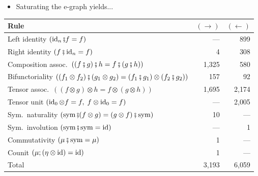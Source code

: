 \documentclass[aspectratio=169]{beamer}
\begin{document}
\begin{frame}
\vfill
\begin{itemize}
\item Saturating the e-graph yields...
\end{itemize}
\centering
\small
\begin{tabular}{@{}lrr@{}}
\toprule
Rule & $(\to)$ & $(\leftarrow)$ \\
\midrule
Left identity \hfill $(\operatorname{id}_n \fatsemi f = f)$ & --- & 899 \\
Right identity \hfill $(f \fatsemi \operatorname{id}_n = f)$ & 4 & 308 \\
Composition assoc.\ \hfill $((f \fatsemi g) \fatsemi h = f \fatsemi (g \fatsemi h))$ & 1{,}325 & 580 \\
Bifunctoriality \hfill $((f_1 \otimes f_2) \fatsemi (g_1 \otimes g_2) = (f_1 \fatsemi g_1) \otimes (f_2 \fatsemi g_2))$ & 157 & 92 \\
Tensor assoc.\ \hfill $((f \otimes g) \otimes h = f \otimes (g \otimes h))$ & 1{,}695 & 2{,}174 \\
Tensor unit \hfill $(\operatorname{id}_0 \otimes f = f,\; f \otimes \operatorname{id}_0 = f)$ & --- & 2{,}005 \\
Sym.\ naturality \hfill $(\operatorname{sym} \fatsemi (f \otimes g) = (g \otimes f) \fatsemi \operatorname{sym})$ & 10 & --- \\
Sym.\ involution \hfill $(\operatorname{sym} \fatsemi \operatorname{sym} = \operatorname{id})$ & --- & 1 \\
Commutativity \hfill $(\mu \fatsemi \operatorname{sym} = \mu)$ & 1 & --- \\
Counit \hfill $(\mu;(\eta \otimes \operatorname{id}) = \operatorname{id})$ & 1 & --- \\
\midrule
Total & 3{,}193 & 6{,}059 \\
\bottomrule
\end{tabular}
\end{frame}
\end{document}
